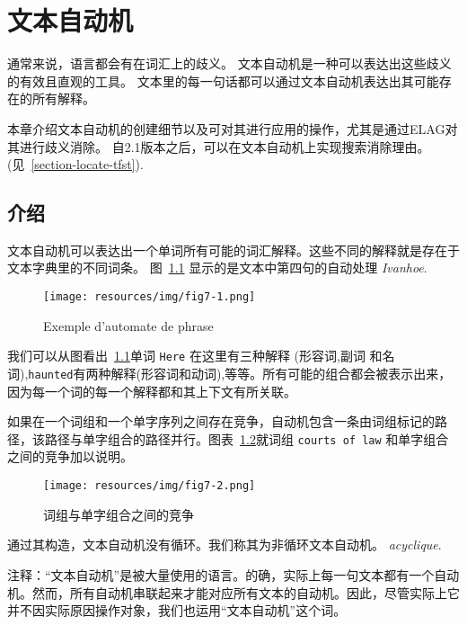 \chapter{文本自动机}
\label{chap-text-automaton}
通常来说，语言都会有在词汇上的歧义。 文本自动机是一种可以表达出这些歧义的有效且直观的工具。 文本里的每一句话都可以通过文本自动机表达出其可能存在的所有解释。


\bigskip
\noindent 本章介绍文本自动机的创建细节以及可对其进行应用的操作，尤其是通过ELAG对其进行歧义消除。 自2.1版本之后，可以在文本自动机上实现搜索消除理由。(见~\ref{section-locate-tfst}).


\section{介绍} 
文本自动机可以表达出一个单词所有可能的词汇解释。这些不同的解释就是存在于文本字典里的不同词条。 图~\ref{fig-sentence-automaton} 显示的是文本中第四句的自动处理 \textit{Ivanhoe}.

\begin{figure}[!ht]
\begin{center}
\texttt{[image: resources/img/fig7-1.png]}
\caption{Exemple d’automate de phrase\label{fig-sentence-automaton}}
\end{center}
\end{figure}

\bigskip
\noindent 我们可以从图看出~\ref{fig-sentence-automaton}单词 \verb+Here+ 在这里有三种解释 (形容词,副词  和名词),\verb+haunted+有两种解释(形容词和动词),等等。所有可能的组合都会被表示出来，因为每一个词的每一个解释都和其上下文有所关联。


\bigskip
\noindent 如果在一个词组和一个单字序列之间存在竞争，自动机包含一条由词组标记的路径，该路径与单字组合的路径并行。图表~\ref{fig-overlap}就词组 \texttt{courts of law} 和单字组合之间的竞争加以说明。

\begin{figure}[!ht]
\begin{center}
\texttt{[image: resources/img/fig7-2.png]}
\caption{词组与单字组合之间的竞争\label{fig-overlap}}
\end{center}
\end{figure}

\bigskip
\noindent 通过其构造，文本自动机没有循环。我们称其为非循环文本自动机。 \textit{acyclique}.

\bigskip
\noindent 注释：“文本自动机”是被大量使用的语言。的确，实际上每一句文本都有一个自动机。然而，所有自动机串联起来才能对应所有文本的自动机。因此，尽管实际上它并不因实际原因操作对象，我们也运用“文本自动机”这个词。

